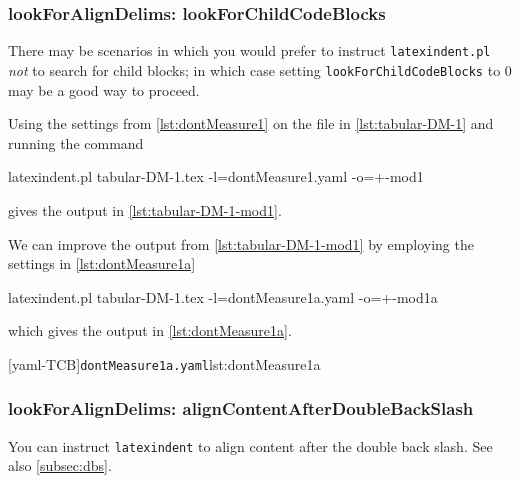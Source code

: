 \documentclass[10pt]{article}
\begin{document}
\subsubsection{lookForAlignDelims: lookForChildCodeBlocks}\label{sec:lookForChildCodeBlocks}
 There  may be scenarios in
 which you would prefer to instruct \texttt{latexindent.pl} \emph{not} to search for
 child blocks; in which case setting \texttt{lookForChildCodeBlocks} to 0 may be a good
 way to proceed.

 \begin{example}
 Using the settings from \vref{lst:dontMeasure1} on the file in \cref{lst:tabular-DM-1}
 and running the command

 \begin{commandshell}
latexindent.pl tabular-DM-1.tex -l=dontMeasure1.yaml -o=+-mod1
\end{commandshell}

 gives the output in \cref{lst:tabular-DM-1-mod1}.
 \begin{cmhtcbraster}
 \end{cmhtcbraster}

 We can improve the output from \cref{lst:tabular-DM-1-mod1} by employing the settings in
 \cref{lst:dontMeasure1a}

 \begin{commandshell}
latexindent.pl tabular-DM-1.tex -l=dontMeasure1a.yaml -o=+-mod1a
\end{commandshell}

 which gives the output in \cref{lst:dontMeasure1a}.

 \begin{cmhtcbraster}
  [yaml-TCB]{\texttt{dontMeasure1a.yaml}}{lst:dontMeasure1a}
 \end{cmhtcbraster}
 \end{example}

\subsubsection{lookForAlignDelims: alignContentAfterDoubleBackSlash}\label{sec:alignContentAfterDoubleBackSlash}
 You can instruct \texttt{latexindent} to align  content after the double back slash. See also \vref{subsec:dbs}.
\end{document}
